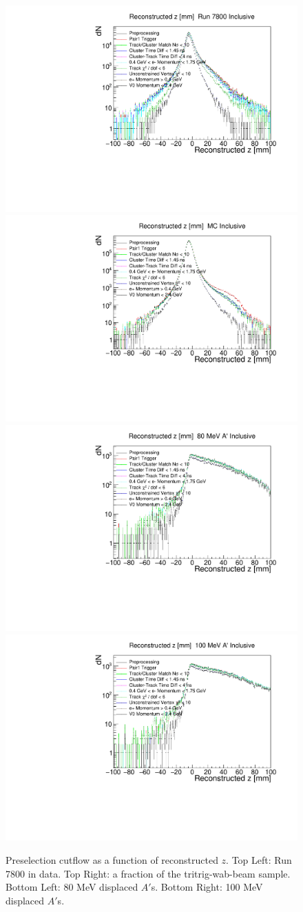 \begin{figure}[t]
    \centering
    \includegraphics[width=.45\textwidth]{figs/recon/pre_cutflow_data.pdf}
    \includegraphics[width=.45\textwidth]{figs/recon/pre_cutflow_mc.pdf}
    \includegraphics[width=.45\textwidth]{figs/recon/pre_cutflow_ap80.pdf}
    \includegraphics[width=.45\textwidth]{figs/recon/pre_cutflow_ap100.pdf}
    \caption{Preselection cutflow as a function of reconstructed $z$. Top Left: Run 7800 in data. Top Right: a fraction of the tritrig-wab-beam sample. Bottom Left: 80 MeV displaced $A'$s. Bottom Right: 100 MeV displaced $A'$s.}
    \label{fig:pre_cutflow_z}
\end{figure}


